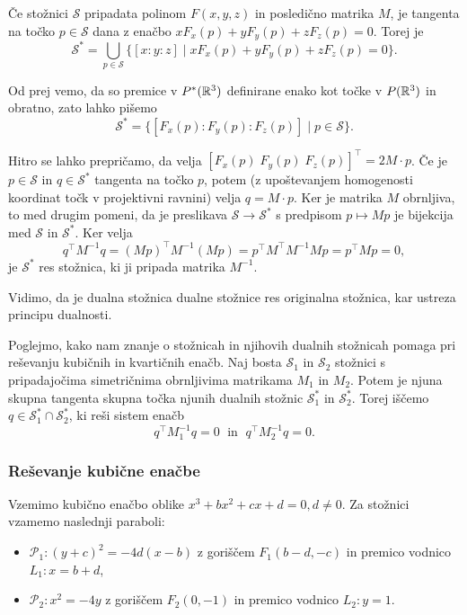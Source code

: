 Če stožnici $\mathcal{S}$ pripadata polinom $F(x,y,z)$ in posledično matrika $M$, je tangenta na točko $p \in \mathcal{S}$ dana z enačbo $x F_x(p) + y F_y(p) + z F_z(p) = 0$. Torej je
$$ \mathcal{S}^* = \bigcup_{p \in \mathcal{S}} \{[x:y:z] \; | \; x F_x(p) + y F_y(p) + z F_z(p) = 0 \}.$$

Od prej vemo, da so premice v $P^*(\mathbb R^3)$ definirane enako kot točke v $P(\mathbb R^3)$ in obratno, zato lahko pišemo
$$ \mathcal{S}^* = \{ [F_x(p) : F_y(p) : F_z(p)] \; | \; p \in \mathcal{S} \}. $$

Hitro se lahko prepričamo, da velja $[F_x(p) \; F_y(p) \; F_z(p)]^\intercal = 2 M \cdot p$. Če je $p \in \mathcal{S}$ in $ q \in \mathcal{S}^*$ tangenta na točko $p$, potem (z upoštevanjem homogenosti koordinat točk v projektivni ravnini) velja $q = M \cdot p$. Ker je matrika $M$ obrnljiva, to med drugim pomeni, da je preslikava $\mathcal{S} \longrightarrow \mathcal{S}^*$ s predpisom $p \mapsto Mp$ je bijekcija med $\mathcal{S}$ in $\mathcal{S}^*$. Ker velja
$$ q^\intercal M^{-1} q = (Mp)^\intercal M^{-1} (Mp) = p^\intercal M^\intercal M^{-1} M p = p^\intercal M p = 0,$$
je $\mathcal{S}^*$ res stožnica, ki ji pripada matrika $M^{-1}$.

\begin{opomba}
    Vidimo, da je dualna stožnica dualne stožnice res originalna stožnica, kar ustreza principu dualnosti.
\end{opomba}

Poglejmo, kako nam znanje o stožnicah in njihovih dualnih stožnicah pomaga pri reševanju kubičnih in kvartičnih enačb. Naj bosta $\mathcal{S}_1$ in $\mathcal{S}_2$ stožnici s pripadajočima simetričnima obrnljivima matrikama $M_1$ in $M_2$. Potem je njuna skupna tangenta skupna točka njunih dualnih stožnic $\mathcal{S}^*_1$ in $\mathcal{S}^*_2$. Torej iščemo $q \in \mathcal{S}^*_1 \cap \mathcal{S}^*_2$, ki reši sistem enačb
\begin{equation}
    \label{eq:afin_sistem_tangenta_splosen}
    q^\intercal M^{-1}_1 q = 0 \; \text{ in } \; q^\intercal M^{-1}_2 q = 0.
\end{equation}

\subsubsection*{Reševanje kubične enačbe}

Vzemimo kubično enačbo oblike $ x^3 + bx^2 + cx + d = 0, d \neq 0$. Za stožnici vzamemo naslednji paraboli:
\begin{itemize}
    \item $\mathcal{P}_1: (y+c)^2 = -4d(x-b)$ z goriščem $F_1 (b - d, -c)$ in premico vodnico $L_1: x = b + d$,
    \item $\mathcal{P}_2: x^2 = -4y$ z goriščem $F_2 (0, -1)$ in premico vodnico $L_2: y = 1$.
\end{itemize}


